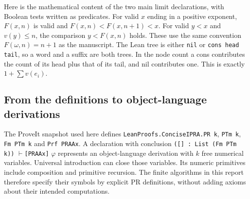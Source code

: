 Here is the mathematical content of the two main limit declarations, with Boolean tests written as predicates. For valid $x$ ending in a positive exponent, $F(x,n)$ is valid and $F(x,n)<F(x,n+1)<x$. For valid $y<x$ and $v(y)\le n$, the comparison $y<F(x,n)$ holds. These use the same convention $F(\omega,n)=n+1$ as the manuscript. The Lean tree is either \texttt{nil} or \texttt{cons head tail}, so a word and a suffix are both trees. In the node count a cons contributes the count of its head plus that of its tail, and nil contributes one. This is exactly $1+\sum v(e_i)$.

\subsection{From the definitions to object-language derivations}
The ProveIt snapshot used here defines \texttt{LeanProofs.ConciseIPRA.PR k}, \texttt{PTm k}, \texttt{Fm PTm k} and \texttt{Prf PRAAx}. A declaration with conclusion
\texttt{([] : List (Fm PTm k))} $\vdash$\texttt{[PRAAx]} $\varphi$ represents an object-language derivation with $k$ free numerical variables. Universal introduction can close those variables. Its numeric primitives include composition and primitive recursion. The finite algorithms in this report therefore specify their symbols by explicit PR definitions, without adding axioms about their intended computations.

